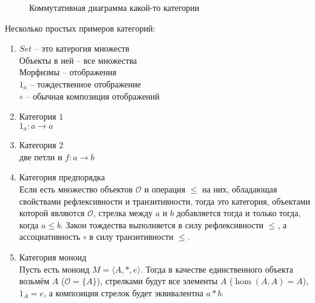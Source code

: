 \begin{figure}
  \centering

  \caption{Коммутативная диаграмма какой-то категории}
  \label{fig:cd1}
\end{figure}
\begin{exm}
  Несколько простых примеров категорий:
  \begin{enumerate}
    \item $Set$ -- это катерогия множеств \\
      Объекты в ней -- все множества \\
      Морфизмы -- отображения \\
      $1_a$ -- тождественное отображение \\
      $\circ$ -- обычная композиция отображений
    \item Категория $1$ \\
      $1_a\colon a \to a$
    \item Категория $2$ \\
      две петли и $f\colon a \to b$
    \item Категория предпорядка \\
      Если есть множество объектов $\mathcal{O}$ и операция $\leq$ на них,
      обладающая свойствами рефлексивности и транзитивности, тогда это категория,
      объектами которой являются $\mathcal{O}$, стрелка между $a$ и $b$
      добавляется тогда и только тогда, когда $a \leq b$. Закон тождества
      выполняется в силу рефлексивности $\leq$, а ассоциативность $\circ$ в силу
      транзитивности $\leq$.
    \item Категория моноид \\
      Пусть есть моноид $M = \langle A, *, e \rangle$. Тогда в качестве
      единственного объекта возьмём $A$ ($\mathcal{O} = \{ A \}$),
      стрелками будут все элементы $A$ ($\hom(A, A) = A$), $1_A = e$, а композиция
      стрелок будет эквивалентна $a * b$.
  \end{enumerate}
\end{exm}

